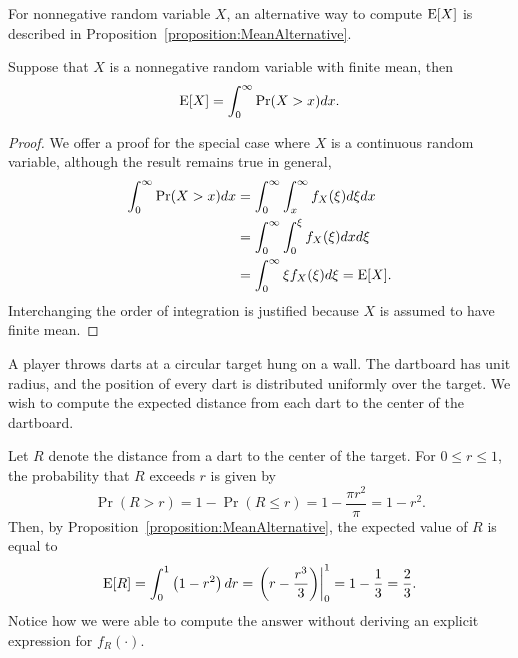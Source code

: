 For nonnegative random variable $X$, an alternative way to compute $\mathrm{E} [X]$ is described in Proposition~\ref{proposition:MeanAlternative}. 

\begin{proposition} \label{proposition:MeanAlternative}
Suppose that $X$ is a nonnegative random variable with finite mean, then
\begin{equation*}
\mathrm{E} [X] = \int_0^{\infty} \Pr (X > x) dx .
\end{equation*}
\end{proposition}
\begin{proof}
We offer a proof for the special case where $X$ is a continuous random variable, although the result remains true in general,
\begin{equation*}
\begin{split}
\int_0^{\infty} \Pr (X > x) dx
&= \int_0^{\infty} \int_x^{\infty} f_X(\xi) d\xi dx \\
&= \int_0^{\infty} \int_0^{\xi} f_X(\xi) dx d\xi \\
&= \int_0^{\infty} \xi f_X(\xi) d\xi
= \mathrm{E} [X] .
\end{split}
\end{equation*}
Interchanging the order of integration is justified because $X$ is assumed to have finite mean.
\end{proof}

\begin{example}
A player throws darts at a circular target hung on a wall.
The dartboard has unit radius, and the position of every dart is distributed uniformly over the target.
We wish to compute the expected distance from each dart to the center of the dartboard.

Let $R$ denote the distance from a dart to the center of the target.
For $0 \leq r \leq 1$, the probability that $R$ exceeds $r$ is given by
\begin{equation*}
\Pr (R > r) = 1 - \Pr (R \leq r) = 1 - \frac{\pi r^2}{\pi} = 1 - r^2 .
\end{equation*}
Then, by Proposition~\ref{proposition:MeanAlternative}, the expected value of $R$ is equal to
\begin{equation*}
\mathrm{E} [R] = \int_0^1 \left( 1 - r^2 \right) dr
= \left.  \left( r - \frac{r^3}{3} \right) \right|_0^1
= 1 - \frac{1}{3} = \frac{2}{3} .
\end{equation*}
Notice how we were able to compute the answer without deriving an explicit expression for $f_R (\cdot)$.
\end{example}


